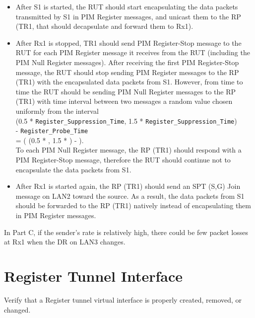 \documentclass[11pt]{report}
\begin{document}
\begin{itemize}

  \item After S1 is started, the RUT should start
  encapsulating the data packets transmitted by S1 in PIM Register messages,
  and unicast them to the RP (TR1, that should decapsulate and forward them to
  Rx1).

  \item After Rx1 is stopped, TR1 should send PIM Register-Stop message to
  the RUT for each PIM Register message it receives from the RUT (including
  the PIM Null Register messages). After receiving the first PIM Register-Stop
  message, the RUT should stop sending PIM Register messages to the RP (TR1)
  with the encapsulated data packets from S1.
  However, from time to time the RUT should be sending PIM Null Register
  messages to the RP (TR1) with time interval between two messages a random
  value chosen uniformly from the interval \\
  (0.5 * \verb=Register_Suppression_Time=,
  1.5 * \verb=Register_Suppression_Time=) \\
  - \verb=Register_Probe_Time= \\
  = ( (0.5 * {\PimsmRegisterSuppressionTime}, 1.5 *
  {\PimsmRegisterSuppressionTime}) - {\PimsmRegisterProbeTime} ). \\
  To each PIM Null Register message, the RP (TR1) should respond with a PIM
  Register-Stop message, therefore the RUT should continue not to encapsulate
  the data packets from S1.

  \item After Rx1 is started again, the RP (TR1) should send an SPT (S,G) Join
  message on LAN2 toward the source. As a result, the data packets from S1
  should be forwarded to the RP (TR1) natively instead of encapsulating them
  in PIM Register messages.

\end{itemize}


In Part C, if the sender's rate is relatively high, there could be few packet
losses at Rx1 when the DR on LAN3 changes.

\newpage
\section{Register Tunnel Interface}

Verify that a Register tunnel virtual interface is properly created, removed,
or changed.
\end{document}
